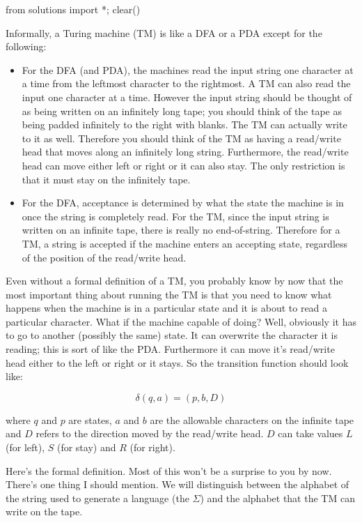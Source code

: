 \begin{python0}
from solutions import *; clear()
\end{python0}

Informally, a Turing machine (TM) is like a DFA or a PDA except for
the following:
\begin{itemize}
\item For the DFA (and PDA), the machines read the input string one
 character at a time from the leftmost character to the rightmost. A
 TM can also read the input one character at a time. However
 the input string should be thought of as being written on an
 infinitely long tape; you should think of the tape as being padded
 infinitely to the right with blanks. The TM can actually write to it
 as well. Therefore you should think of the TM as having a read/write
 head that moves along an infinitely long string.
 Furthermore, the read/write head can move either
 left or right or it can also stay. The only restriction is that it
 must stay on the infinitely tape.
\item For the DFA, acceptance is
 determined by what the state the machine is in once the string is
 completely read. For the TM, since the input string is written on an
 infinite tape, there is really no end-of-string. Therefore for a TM, a string is
 accepted if the machine enters an accepting state, regardless of the
 position of the read/write head.
\end{itemize}

Even without a formal definition of a TM, you probably know by now
that the most important thing about running the TM is that you need
to know what happens when the machine is in a particular state and
it is about to read a particular character. What if the machine
capable of doing? Well, obviously it has to go to another (possibly
the same) state. It can overwrite the character it is reading; this
is sort of like the PDA. Furthermore it can move it's read/write
head either to the left or right or it stays. So the transition
function should look like:

\[\delta(q, a) = (p, b, D)\]

where $q$ and $p$ are states, $a$ and $b$ are the allowable
characters on the infinite tape and $D$ refers to the direction
moved by the read/write head. $D$ can take values $L$ (for left),
$S$ (for stay) and $R$ (for right).

Here's the formal definition. Most of this won't be a surprise to
you by now. There's one thing I should mention. We will distinguish
between the alphabet of the string used to generate a language (the
$\Sigma$) and the alphabet that the TM can write on the tape.

